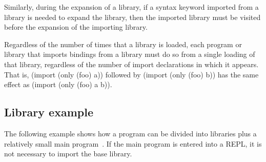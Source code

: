 Similarly, during the expansion of a library, if a syntax keyword
imported from a library is needed to expand the library, then the
imported library must be visited before the expansion of the importing
library.

Regardless of the number of times that a library is loaded, each
program or library that imports bindings from a library must do so from a
single loading of that library, regardless of the number of import
declarations in which it appears.
That is, {\cf (import (only (foo) a))} followed by {\cf (import (only (foo) b))}
has the same effect as {\cf (import (only (foo) a b))}.

\subsection{Library example}
The following example shows
how a program can be divided into libraries plus a relatively small
main program~\cite{life}.
If the main program is entered into a REPL, it is not necessary to import
the base library.

